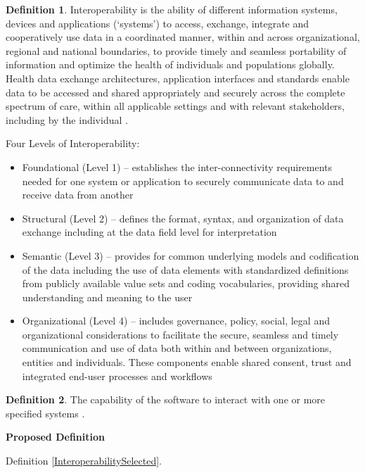 \documentclass[letterpaper,cleveref]{lipics-v2019}
\theoremstyle{definition}
\newtheorem{defn}{Definition}
\begin{document}
\begin{defn}
  Interoperability is the ability of different information systems, devices and
  applications (‘systems’) to access, exchange, integrate and cooperatively use
  data in a coordinated manner, within and across organizational, regional and
  national boundaries, to provide timely and seamless portability of information
  and optimize the health of individuals and populations globally. Health data
  exchange architectures, application interfaces and standards enable data to be
  accessed and shared appropriately and securely across the complete spectrum of
  care, within all applicable settings and with relevant stakeholders, including
  by the individual \citep{HIMSS2019}.
	
  Four Levels of Interoperability:
  \begin{itemize}
  \item Foundational (Level 1) – establishes the inter-connectivity requirements
    needed for one system or application to securely communicate data to and
    receive data from another
		
  \item Structural (Level 2) – defines the format, syntax, and organization of
    data exchange including at the data field level for interpretation
		
  \item Semantic (Level 3) – provides for common underlying models and
    codification of the data including the use of data elements with
    standardized definitions from publicly available value sets and coding
    vocabularies, providing shared understanding and meaning to the user
		
  \item Organizational (Level 4) – includes governance, policy, social, legal
    and organizational considerations to facilitate the secure, seamless and
    timely communication and use of data both within and between organizations,
    entities and individuals. These components enable shared consent, trust and
    integrated end-user processes and workflows
  \end{itemize}
\end{defn}

\begin{defn}
  The capability of the software to interact with one or more specified systems
  \cite{ISO9126}.
\end{defn}
\noindent \textbf{Proposed Definition}

Definition \ref{InteroperabilitySelected}.
\end{document}
